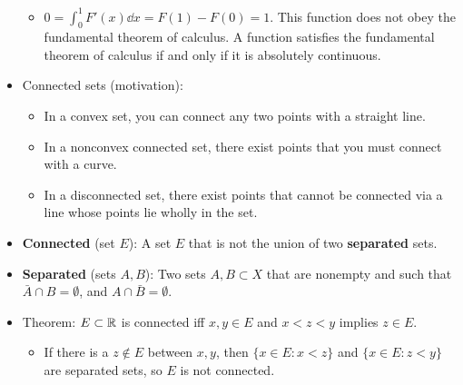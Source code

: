 \documentclass[../../notes.tex]{subfiles}
\begin{document}
\begin{itemize}
    \begin{itemize}
        \item $0=\int_0^1F'(x)\dd{x}=F(1)-F(0)=1$. This function does not obey the fundamental theorem of calculus. A function satisfies the fundamental theorem of calculus if and only if it is absolutely continuous.
    \end{itemize}
    \item Connected sets (motivation):
    \begin{itemize}
        \item In a convex set, you can connect any two points with a straight line.
        \item In a nonconvex connected set, there exist points that you must connect with a curve.
        \item In a disconnected set, there exist points that cannot be connected via a line whose points lie wholly in the set.
    \end{itemize}
    \item \textbf{Connected} (set $E$): A set $E$ that is not the union of two \textbf{separated} sets.
    \item \textbf{Separated} (sets $A,B$): Two sets $A,B\subset X$ that are nonempty and such that $\bar{A}\cap B=\emptyset$, and $A\cap\bar{B}=\emptyset$.
    \item Theorem: $E\subset\mathbb{R}$ is connected iff $x,y\in E$ and $x<z<y$ implies $z\in E$.
    \begin{itemize}
        \item If there is a $z\notin E$ between $x,y$, then $\{x\in E:x<z\}$ and $\{x\in E:z<y\}$ are separated sets, so $E$ is not connected.
    \end{itemize}
\end{itemize}
\end{document}

